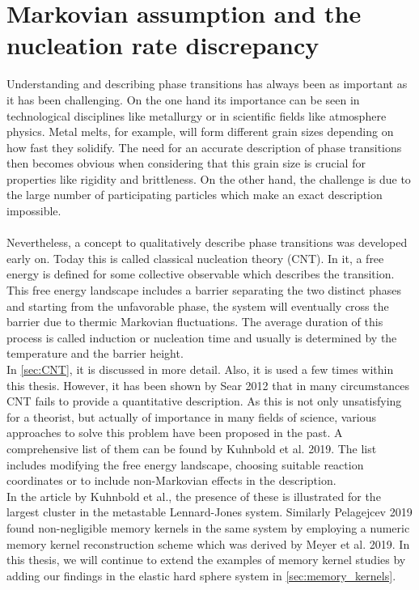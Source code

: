 
\label{chp:theory}

\section{Markovian assumption and the nucleation rate discrepancy}
\label{sec:memory_approach}
Understanding and describing phase transitions has always been as important as it has been challenging. On the one hand its importance can be seen in technological disciplines like metallurgy or in scientific fields like atmosphere physics. Metal melts, for example, will form different grain sizes depending on how fast they solidify. The need for an accurate description of phase transitions then becomes obvious when considering that this grain size is crucial for properties like rigidity and brittleness. On the other hand, the challenge is due to the large number of participating particles which make an exact description impossible.\\\\
Nevertheless, a concept to qualitatively describe phase transitions was developed early on. Today this is called classical nucleation theory (CNT). In it, a free energy is defined for some collective observable which describes the transition. This free energy landscape includes a barrier separating the two distinct phases and starting from the unfavorable phase, the system will eventually cross the barrier due to thermic Markovian fluctuations. The average duration of this process is called induction or nucleation time and usually is determined by the temperature and the barrier height.\\

In \autoref{sec:CNT}, it is discussed in more detail. Also, it is used a few times within this thesis. However, it has been shown by Sear 2012\cite{Sear2012} that in many circumstances CNT fails to provide a quantitative description. As this is not only unsatisfying for a theorist, but actually of importance in many fields of science, various approaches to solve this problem have been proposed in the past. A comprehensive list of them can be found by Kuhnbold et al. 2019\cite{Kuhnbold2019}. The list includes modifying the free energy landscape, choosing suitable reaction coordinates or to include non-Markovian effects in the description.\\ 

In the article by Kuhnbold et al., the presence of these is illustrated for the largest cluster in the metastable Lennard-Jones system. Similarly Pelagejcev 2019\cite{ThesisPhilipp} found non-negligible memory kernels in the same system by employing a numeric memory kernel reconstruction scheme which was derived by Meyer et al. 2019\cite{Meyer2019a}. In this thesis, we will continue to extend the examples of memory kernel studies by adding our findings in the elastic hard sphere system in \autoref{sec:memory_kernels}.\\

